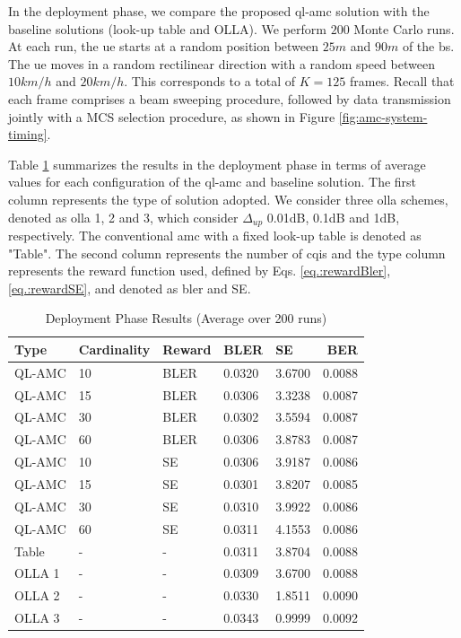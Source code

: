 In the deployment phase, we compare the proposed \gls{ql-amc} solution with the baseline solutions (look-up table and OLLA).
%
We perform $200$ Monte Carlo runs. At each run, the \gls{ue} starts at a random position between $25m$ and $90m$ of the \gls{bs}.
%
The \gls{ue} moves in a random rectilinear direction with a random speed between $10km/h$ and $20km/h$. This corresponds to a total of $K=125$ frames. Recall that each frame comprises a beam sweeping procedure, followed by data transmission jointly with a MCS selection procedure, as shown in Figure \ref{fig:amc-system-timing}.
%


Table \ref{tab:amc-deploy-results} summarizes the results in the deployment phase in terms of average values for each configuration of the \gls{ql-amc} and baseline solution.
%
The first column represents the type of solution adopted.
%
%
We consider three \gls{olla} schemes, denoted as \gls{olla} 1, 2 and 3, which consider $\Delta_{up}$ 0.01dB, 0.1dB and 1dB, respectively.
%
The conventional \gls{amc} with a fixed look-up table is denoted as "Table".
%
The second column represents the number of \gls{cqi}s and the type column represents the reward function used, defined by Eqs. \eqref{eq.:rewardBler}, \eqref{eq.:rewardSE}, and denoted as \gls{bler} and SE.
%

\begin{table}[tb]
\centering
\caption{Deployment Phase Results (Average over 200 runs)}
\label{tab:amc-deploy-results}
\begin{tabularx}{\columnwidth}{l X X X X r}
  \toprule
  Type    & Cardinality &      Reward  &  BLER &     SE  &    BER \\
  \midrule
   QL-AMC &     10 &           BLER   & 0.0320 &  3.6700 & 0.0088 \\
   QL-AMC &     15 &           BLER   & 0.0306 &  3.3238 & 0.0087 \\
   QL-AMC &     30 &           BLER   & 0.0302 &  3.5594 & 0.0087 \\
   QL-AMC &     60 &           BLER   & 0.0306 &  3.8783 & 0.0087 \\
   QL-AMC &     10 &           SE     & 0.0306 &  3.9187 & 0.0086 \\
   QL-AMC &     15 &           SE     & 0.0301 &  3.8207 & 0.0085 \\
   QL-AMC &     30 &           SE     & 0.0310 &  3.9922 & 0.0086 \\
   QL-AMC &     60 &           SE     & 0.0311 &  4.1553 & 0.0086 \\
    Table &      - &           -      & 0.0311 &  3.8704 & 0.0088 \\
   OLLA 1 &      - &           -      & 0.0309 &  3.6700 & 0.0088 \\
   OLLA 2 &      - &           -      & 0.0330 &  1.8511 & 0.0090 \\
   OLLA 3 &      - &           -      & 0.0343 &  0.9999 & 0.0092 \\
  \bottomrule
\end{tabularx}
\end{table}

